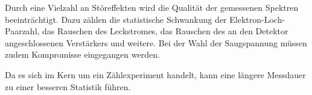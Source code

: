 Durch eine Vielzahl an Störeffekten wird die Qualität der gemessenen Spektren beeinträchtigt.
Dazu zählen
    die statistische Schwankung der Elektron-Loch-Paarzahl,
    das Rauschen des Leckstromes,
    das Rauschen des an den Detektor angeschlossenen Verstärkers
    und weitere.
Bei der Wahl der Saugspannung müssen zudem Kompromisse eingegangen werden.

Da es sich im Kern um ein Zählexperiment handelt,
kann eine längere Messdauer zu einer besseren Statistik führen.


